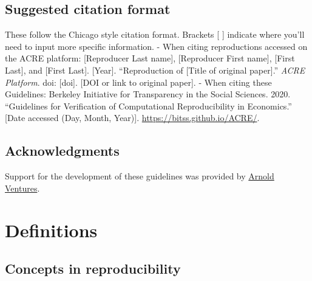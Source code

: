 \documentclass[]{book}
\begin{document}
\hypertarget{suggested-citation-format}{%
\section{Suggested citation format}\label{suggested-citation-format}}

These follow the Chicago style citation format. Brackets {[} {]} indicate where you'll need to input more specific information.
- When citing reproductions accessed on the ACRE platform: {[}Reproducer Last name{]}, {[}Reproducer First name{]}, {[}First Last{]}, and {[}First Last{]}. {[}Year{]}. ``Reproduction of {[}Title of original paper{]}.'' \emph{ACRE Platform}. doi: {[}doi{]}. {[}DOI or link to original paper{]}.
- When citing these Guidelines: Berkeley Initiative for Transparency in the Social Sciences. 2020. ``Guidelines for Verification of
Computational Reproducibility in Economics.'' {[}Date accessed (Day, Month, Year){]}. \url{https://bitss.github.io/ACRE/}.

\hypertarget{acknowledgments}{%
\section{Acknowledgments}\label{acknowledgments}}

Support for the development of these guidelines was provided by \href{https://www.arnoldventures.org/}{Arnold Ventures}.

\hypertarget{definitions}{%
\chapter{Definitions}\label{definitions}}

\hypertarget{concepts-in-reproducibility}{%
\section{Concepts in reproducibility}\label{concepts-in-reproducibility}}
\end{document}
